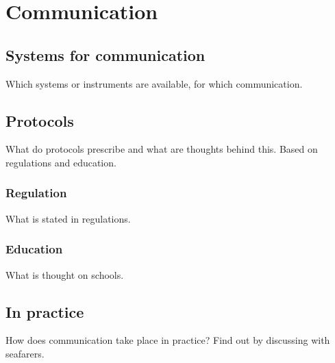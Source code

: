 \chapter{Communication}

\section{Systems for communication}
Which systems or instruments are available, for which communication.

\section{Protocols}
What do protocols prescribe and what are thoughts behind this.
Based on regulations and education.

\subsection{Regulation}
What is stated in regulations.

\subsection{Education}
What is thought on schools.

\section{In practice}
How does communication take place in practice?
Find out by discussing with seafarers.